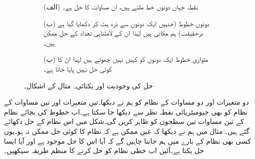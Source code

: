 \begin{figure}
\centering
\begin{subfigure}{0.5\textwidth}
\centering
{}
\caption*{(الف) نقطہ  جہاں دونوں خط ملتے ہیں، ان مساوات کا حل ہے۔}
\end{subfigure}%
\begin{subfigure}{0.5\textwidth}
\centering
{}
\caption*{(ب) دونوں خطوط (جنہیں ایک دونوں سے ذرہ ہٹ کر دکھایا گیا ہے درحقیقت) ہم مکانی ہیں لہٰذا ان کے لامتناہی تعداد کے حل ممکن ہیں۔}
\end{subfigure}
\begin{subfigure}{0.5\textwidth}
\centering
{}
\caption*{(پ) متوازی خطوط ایک دونوں کو کہیں نہیں چھوتے ہیں لہٰذا ان کا کوئی حل نہیں پایا جاتا ہے۔}
\end{subfigure}%
\caption{حل کی وجودیت اور یکتائی۔ مثال  کے اشکال۔}
\label{شکل_مثال_الجبرا_وجودیت_یکتائی_حل_الف}
\end{figure}
دو متغیرات اور دو مساوات کے نظام کو ہم نے دیکھا۔تین متغیرات اور تین مساوات کے نظام  کو بھی جیومیٹریائی نقطہ نظر سے دیکھا جا سکتا ہے۔اب خطوط کی بجائے نظام کے تین مساوات تین سطحوں کو ظاہر کریں گی۔شکل میں اس نظام کے حل دکھائے گئے ہیں۔
مثال  میں ہم نے دیکھا کہ عین ممکن ہے کہ نظام کا کوئی حل ممکن نہ ہو۔یوں کسی بھی نظام کے بارے میں ہم جاننا چاہیں گے کہ آیا اس کا حل موجود ہے اور آیا ایسا حل یکتا ہے۔آئیں اب خطی نظام کو حل کرنے کا منظم طریقہ سیکھیں۔

